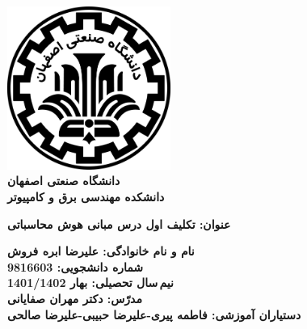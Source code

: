 \begin{titlepage}
\begin{center}
\includegraphics[width=0.4\textwidth]{figures/IUT Logo.png}\\
        
\LARGE
\textbf{دانشگاه صنعتی اصفهان}\\
\textbf{دانشکده مهندسی برق و کامپیوتر}\\
        
\vfill
        
\huge
\textbf{عنوان: تکلیف اول درس مبانی هوش محاسباتی}\\
        
\vfill
        
\LARGE
\textbf{نام و نام خانوادگی: علیرضا ابره فروش}\\
\textbf{شماره دانشجویی: 9816603}\\
\textbf{نیم\,سال تحصیلی: بهار 1401/1402}\\
\textbf{مدرّس: دکتر مهران صفایانی}\\
\textbf{دستیاران آموزشی: فاطمه پیری-علیرضا حبیبی-علیرضا صالحی}\\
\end{center}
\end{titlepage}
